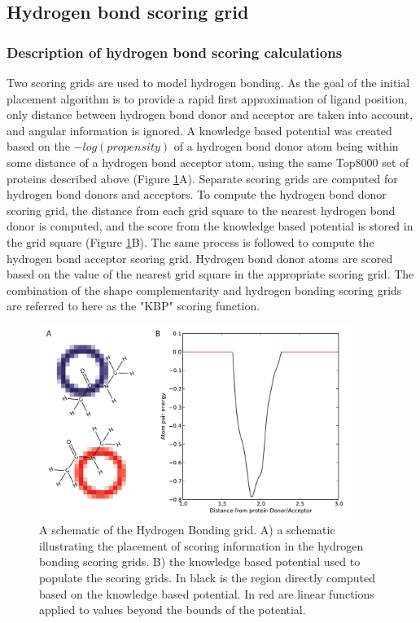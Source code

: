 \subsection{Hydrogen bond scoring grid}

\subsubsection{Description of hydrogen bond scoring calculations}

Two scoring grids are used to model hydrogen bonding.
As the goal of the initial placement algorithm is to provide a rapid first approximation of ligand position, only distance between hydrogen bond donor and acceptor are taken into account, and angular information is ignored.
A knowledge based potential was created based on the $-log(propensity)$ of a hydrogen bond donor atom being within some distance of a hydrogen bond acceptor atom, using the same Top8000 set of proteins described above (Figure \ref{fig:hbond_schematic}A).
Separate scoring grids are computed for hydrogen bond donors and acceptors. To compute the hydrogen bond donor scoring grid, the distance from each grid square to the nearest hydrogen bond donor is computed, and the score from the knowledge based potential is stored in the grid square (Figure \ref{fig:hbond_schematic}B).
The same process is followed to compute the hydrogen bond acceptor scoring grid.
Hydrogen bond donor atoms are scored based on the value of the nearest grid square in the appropriate scoring grid.  
The combination of the shape complementarity and hydrogen bonding scoring grids are referred to here as the "\ac{KBP}" scoring function. 
\begin{figure}
\centering
\includegraphics[width=4in]{figures/lowres_appendix/Hydrogen_Bonding.pdf}
\caption{
A schematic of the Hydrogen Bonding grid.
A) a schematic illustrating the placement of scoring information in the hydrogen bonding scoring grids.
B) the knowledge based potential used to populate the scoring grids.
In black is the region directly computed based on the knowledge based potential.  In red are linear functions applied to values beyond the bounds of the potential.
}
\label{fig:hbond_schematic}
\end{figure}

